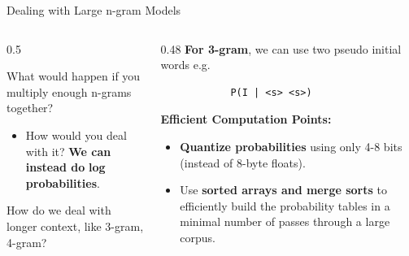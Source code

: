 \documentclass[aspectratio=169,xcolor=dvipsnames,svgnames,x11names,fleqn]{beamer}
\begin{document}
\begin{frame}[fragile]{Dealing with Large n-gram Models}
    \begin{columns}[T]
        \begin{column}{0.5\textwidth}
            \small
            \begin{tcolorbox}[colback=uiRose!5, colframe=uiRose, arc=1mm, title=\scriptsize The Multiplication Problem, fonttitle=\bfseries]
                What would happen if you multiply enough n-grams together?
            \end{tcolorbox}
            
            \pause
            \begin{itemize}
                \item[\textcolor{uiRose}{\faArrowRight}] How would you deal with it? \pause \textbf{We can instead do} \textcolor{uiRose}{\textbf{log probabilities}}.
            \end{itemize}
            
            \vspace{10pt}
            \pause
            
            \begin{tcolorbox}[colback=uiTeal!5, colframe=uiTeal, arc=1mm, title=\scriptsize Context Expansion, fonttitle=\bfseries]
                How do we deal with longer context, like 3-gram, 4-gram?
            \end{tcolorbox}
        \end{column}

        \begin{column}{0.48\textwidth}
            \pause
            \scriptsize
            \textbf{For 3-gram}, we can use two pseudo initial words e.g.
            
            \vspace{5pt}
            \begin{verbatim}
            P(I | <s> <s>)
            \end{verbatim}

            \vspace{10pt}
            \pause
            \textcolor{uiCharcoal}{\textbf{Efficient Computation Points:}}
            \begin{itemize}
                \item[\textcolor{uiTeal}{\textbullet}] \textbf{Quantize probabilities} using only 4-8 bits (instead of 8-byte floats).
                \item[\textcolor{uiTeal}{\textbullet}] Use \textbf{sorted arrays and merge sorts} to efficiently build the probability tables in a minimal number of passes through a large corpus.
            \end{itemize}
        \end{column}
    \end{columns}
\end{frame}
\end{document}
